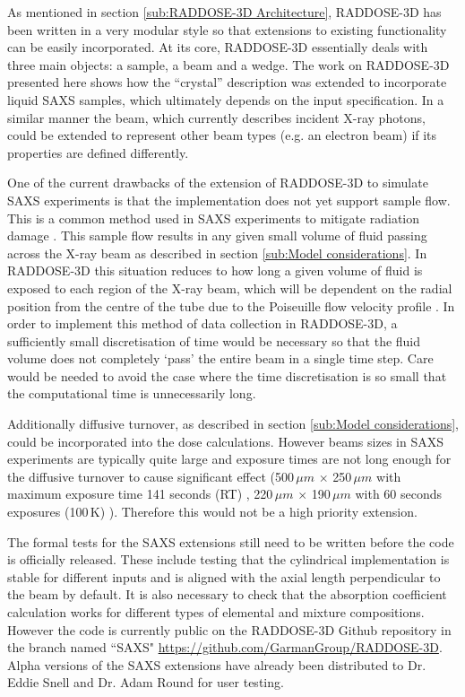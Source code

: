 As mentioned in section \ref{sub:RADDOSE-3D Architecture}, RADDOSE-3D has been written in a very modular style so that extensions to existing functionality can be easily incorporated.
At its core, RADDOSE-3D essentially deals with three main objects: a sample, a beam and a wedge.
The work on RADDOSE-3D presented here shows how the ``crystal'' description was extended to incorporate liquid SAXS samples, which ultimately depends on the input specification.
In a similar manner the beam, which currently describes incident X-ray photons, could be extended to represent other beam types (e.g. an electron beam) if its properties are defined differently.

One of the current drawbacks of the extension of RADDOSE-3D to simulate SAXS experiments is that the implementation does not yet support sample flow.
This is a common method used in SAXS experiments to mitigate radiation damage \cite{jeffries2015limiting}.
This sample flow results in any given small volume of fluid passing across the X-ray beam as described in section \ref{sub:Model considerations}.
In RADDOSE-3D this situation reduces to how long a given volume of fluid is exposed to each region of the X-ray beam, which will be dependent on the radial position from the centre of the tube due to the Poiseuille flow velocity profile \cite{hopkins2016quantifying}.
In order to implement this method of data collection in RADDOSE-3D, a sufficiently small discretisation of time would be necessary so that the fluid volume does not completely `pass' the entire beam in a single time step.
Care would be needed to avoid the case where the time discretisation is so small that the computational time is unnecessarily long.

Additionally diffusive turnover, as described in section \ref{sub:Model considerations}, could be incorporated into the dose calculations.
However beams sizes in SAXS experiments are typically quite large and exposure times are not long enough for the diffusive turnover to cause significant effect (500$\,\mu m$ $\times$ 250$\,\mu m$ with maximum exposure time 141 seconds (RT) \cite{jeffries2015limiting}, 220$\,\mu m$ $\times$ 190$\,\mu m$ with 60 seconds exposures (100$\,$K) \cite{meisburger2013breaking}).
Therefore this would not be a high priority extension.

The formal tests for the SAXS extensions still need to be written before the code is officially released.
These include testing that the cylindrical implementation is stable for different inputs and is aligned with the axial length perpendicular to the beam by default.
It is also necessary to check that the absorption coefficient calculation works for different types of elemental and mixture compositions.
However the code is currently public on the RADDOSE-3D Github repository in the branch named ``SAXS" \url{https://github.com/GarmanGroup/RADDOSE-3D}.
Alpha versions of the SAXS extensions have already been distributed to Dr. Eddie Snell and Dr. Adam Round for user testing.

